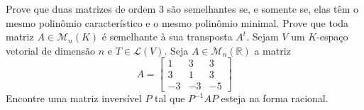 \documentclass[11pt,a4paper]{article}
\begin{document}
     Prove que duas matrizes de ordem $3$ são semelhantes se, e somente se, elas têm o mesmo polinômio característico e o mesmo polinômio minimal.
 \solucao{}
     Prove que toda matriz $A \in \mathcal{M}_n(K)$ é semelhante à sua transposta $A^t.$
 \solucao{
 
 }
     Sejam $V$ um $K$-espaço vetorial de dimensão $n$ e $T \in \mathcal{L}(V).$
 \solucao{}
Seja $A \in \mathcal{M}_n(\mathbb{R})$ a matriz
\[
A = \begin{bmatrix}
1 & 3 & 3 \\
3 & 1 & 3 \\
-3 & -3 & -5
\end{bmatrix}
\]
Encontre uma matriz inversível $P$ tal que $P^{-1}AP$ esteja na forma racional.
\end{document}
